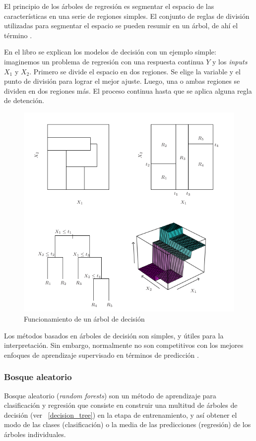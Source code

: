 \documentclass[12pt,a4paper,Spanish]{article}
\begin{document}
El principio de los árboles de regresión es segmentar el espacio de las características en una serie de regiones simples. El conjunto de reglas de división utilizadas para segmentar el espacio se pueden resumir en un árbol, de ahí el término \cite{gareth2013introduction}.
\newline

En el libro  se explican los modelos de decisión con un ejemplo simple: imaginemos un problema de regresión con una respuesta continua $Y$ y los \textit{inputs} $X_1$ y $X_2$. Primero se divide el espacio en dos regiones. Se elige la variable y el punto de división para lograr el mejor ajuste. Luego, una o ambas regiones se dividen en dos regiones más. El proceso continua hasta que se aplica alguna regla de detención.



\begin{figure}[H]
	\centering
	\includegraphics[width=0.7\linewidth]{figs/decission_tree}
	\caption{Funcionamiento de un árbol de decisión \cite{gareth2013introduction}}
	\label{fig:decissiontree}
\end{figure}


Los métodos basados en árboles de decisión son simples, y útiles para la interpretación. Sin embargo, normalmente no son competitivos con los mejores enfoques de aprendizaje supervisado en términos de predicción \cite{gareth2013introduction}.

\subsubsection{Bosque aleatorio}
Bosque aleatorio (\textit{random forests}) son un método de aprendizaje para clasificación y regresión que consiste en construir una multitud de árboles de decisión (ver ~\ref{decision_tree}) en la etapa de entrenamiento, y así obtener el modo de las clases (clasificación) o la media de las predicciones (regresión) de los árboles individuales.
\newline
\end{document}
